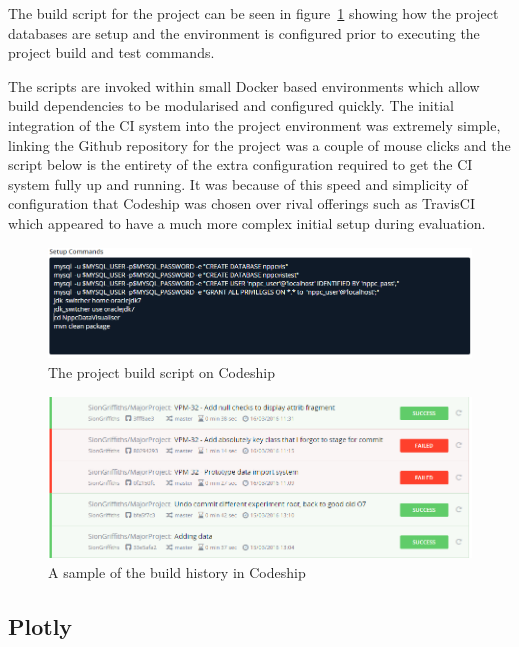  The build script for the project can be seen in figure~\ref{fig:build_script} showing how the project databases are setup and the environment is configured prior to executing the project build and test commands.

 The scripts are invoked within small Docker \cite{docker} based environments which allow build dependencies to be modularised and configured quickly. The initial integration of the CI system into the project environment was extremely simple, linking the Github repository for the project was a couple of mouse clicks and the script below is the entirety of the extra configuration required to get the CI system fully up and running. It was because of this speed and simplicity of configuration that Codeship was chosen over rival offerings such as TravisCI \cite{travis} which appeared to have a much more complex initial setup during evaluation.

\begin{figure}[H]
    \centering
    \includegraphics[width=\textwidth]{images/tools/codeShipScript}
    \caption{The project build script on Codeship}
    \label{fig:build_script}
\end{figure} 

\begin{figure}[H]
    \centering
    \includegraphics[width=\textwidth]{images/tools/codeShipSmall}
    \caption{A sample of the build history in Codeship}
    \label{fig:build_history}
\end{figure} 



\subsection{Plotly}

